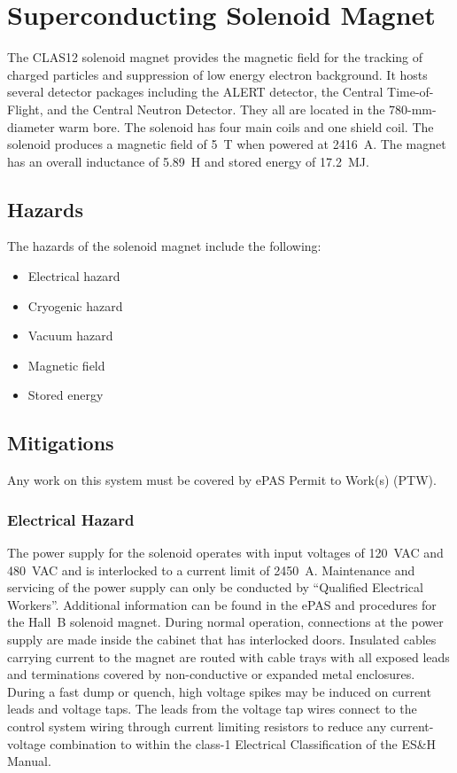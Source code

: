\section{Superconducting Solenoid Magnet}

The CLAS12 solenoid magnet provides the magnetic field for the tracking of charged 
particles and suppression of low energy electron background. It hosts several detector 
packages including the ALERT detector, the Central Time-of-Flight, 
and the Central Neutron Detector. They all are located in the 780-mm-diameter warm bore. 
The solenoid has four main coils and one shield coil. The solenoid produces a magnetic 
field of 5~T when powered at 2416~A. The magnet has an overall inductance of 5.89~H and 
stored energy of 17.2~MJ.

\subsection{Hazards} 

The hazards of the solenoid magnet include the following:

\begin{itemize}
\item Electrical hazard
\item Cryogenic hazard
\item Vacuum hazard
\item Magnetic field
\item Stored energy
\end{itemize}

\subsection{Mitigations}
Any work on this system must be covered by ePAS Permit to Work(s) (PTW).

\subsubsection{Electrical Hazard}

The power supply for the solenoid operates with input voltages of 120~VAC and 480~VAC and 
is interlocked to a current limit of 2450~A. Maintenance and servicing of the power supply 
can only be conducted by ``Qualified Electrical Workers''. Additional information can be 
found in the ePAS and procedures for the Hall~B solenoid magnet. During normal operation, connections at 
the power supply are made inside the cabinet that has interlocked doors. Insulated cables 
carrying current to the magnet are routed with cable trays with all exposed leads and 
terminations covered by non-conductive or expanded metal enclosures. During a fast dump or 
quench, high voltage spikes may be induced on current leads and voltage taps. The leads from
the voltage tap wires connect to the control system wiring through current limiting resistors 
to reduce any current-voltage combination to within the class-1 Electrical Classification of 
the ES\&H Manual.

